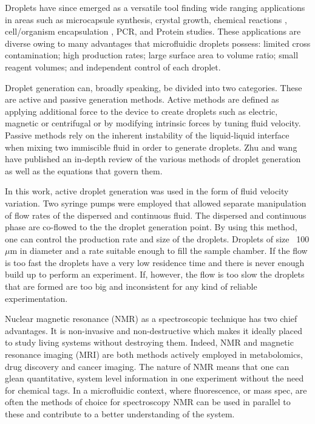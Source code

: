 Droplets have since emerged as a versatile tool finding wide ranging applications in areas
such as microcapsule synthesis\citep{RN105}, crystal growth\citep{RN106}, chemical reactions
\citep{RN114}, cell/organism encapsulation \citep{RN107,RN108, RN113}, PCR\citep{RN109,
RN110}, and Protein studies\citep{RN111, RN112}. These applications are diverse owing to many
advantages that microfluidic droplets possess: limited cross contamination; high production
rates; large surface area to volume ratio; small reagent volumes; and independent control of
each droplet\citep{RN102}.

Droplet generation can, broadly speaking, be divided into two categories. These are active
and passive generation methods. Active methods are defined as applying additional force to
the device to create droplets such as electric\citep{RN116}, magnetic\citep{RN117} or
centrifugal\citep{RN11} or by modifying intrinsic forces by tuning fluid
velocity\citep{RN58}. Passive methods rely on the inherent instability of the liquid-liquid
interface when mixing two immiscible fluid in order to generate droplets\citep{RN120, RN121,
RN122}. Zhu and wang\citep{RN123} have published an in-depth review of the various methods of
droplet generation as well as the equations that govern them.

In this work, active droplet generation was used in the form of fluid velocity variation. Two
syringe pumps were employed that allowed separate manipulation of flow rates of the dispersed
and continuous fluid. The dispersed and continuous phase are co-flowed to the the droplet
generation point. By using this method, one can control the production rate and size of the
droplets. Droplets of size ~100 $\mu\text{m}$ in diameter and a rate suitable enough to fill
the sample chamber. If the flow is too fast the droplets have a very low residence time and
there is never enough build up to perform an experiment. If, however, the flow is too slow
the droplets that are formed are too big and inconsistent for any kind of reliable
experimentation.

Nuclear magnetic resonance (NMR) as a spectroscopic technique has two chief advantages. It is
non-invasive and non-destructive which makes it ideally placed to study living systems without
destroying them. Indeed, NMR and magnetic resonance imaging (MRI) are both methods actively
employed in metabolomics\citep{RN124}, drug discovery\citep{RN125} and cancer
imaging\citep{RN126}. The nature of NMR means that one can glean quantitative, system
level information in one experiment without the need for chemical tags. In a microfluidic
context, where fluorescence\citep{horrocks2015fast, schlimpert2016fluorescence}, or
mass spec\citep{redman2016characterization,choi2016digital}, are often the methods of choice
for spectroscopy NMR can be used in parallel to these and contribute to a better understanding of the system.

